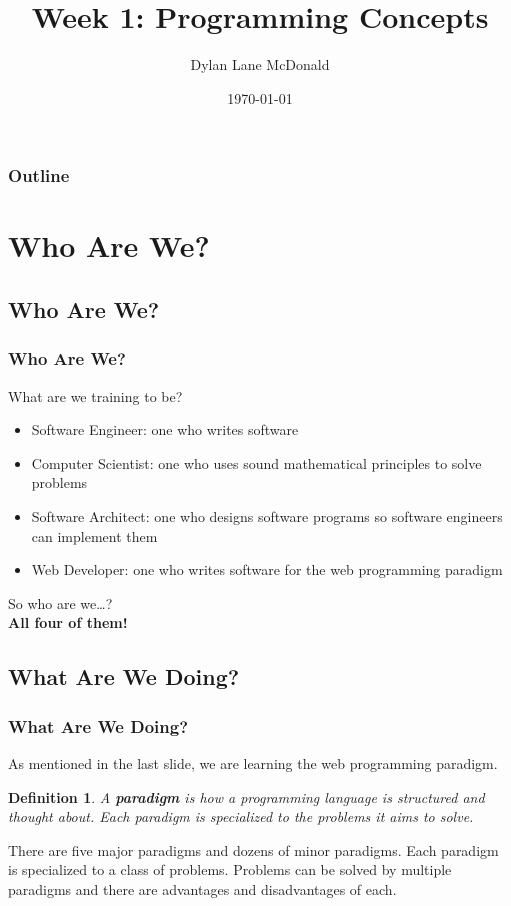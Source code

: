 \documentclass[aspectratio=169]{beamer}
\title{Week 1: Programming Concepts}
\author{Dylan Lane McDonald}
\institute{CNM STEMulus Center\\Web Development with PHP}
\date{\today}
\newtheorem{defn}{Definition}
\begin{document}
\lstset{language=HTML}
\begin{frame}
\titlepage
\end{frame}

\begin{frame}
\frametitle{Outline}
\tableofcontents
\end{frame}

\section{Who Are We?}
\subsection{Who Are We?}
\begin{frame}
\frametitle{Who Are We?}
What are we training to be?
\begin{itemize}
	\item Software Engineer: one who writes software
	\pause
	\item Computer Scientist: one who uses sound mathematical principles to solve problems
	\pause
	\item Software Architect: one who designs software programs so software engineers can implement them
	\pause
	\item Web Developer: one who writes software for the web programming paradigm
\end{itemize}
\pause
So who are we\dots?
\pause
\mbox{}\\
\textbf{All four of them!}
\end{frame}

\subsection{What Are We Doing?}
\begin{frame}
\frametitle{What Are We Doing?}
As mentioned in the last slide, we are learning the web programming paradigm.
\pause
\begin{defn}
A \textbf{paradigm} is how a programming language is structured and thought about. Each paradigm is specialized to the problems it aims to solve.
\end{defn}
\pause
There are five major paradigms and dozens of minor paradigms. Each paradigm is specialized to a class of problems. Problems can be solved by multiple paradigms and there are advantages and disadvantages of each.
\end{frame}
\end{document}

